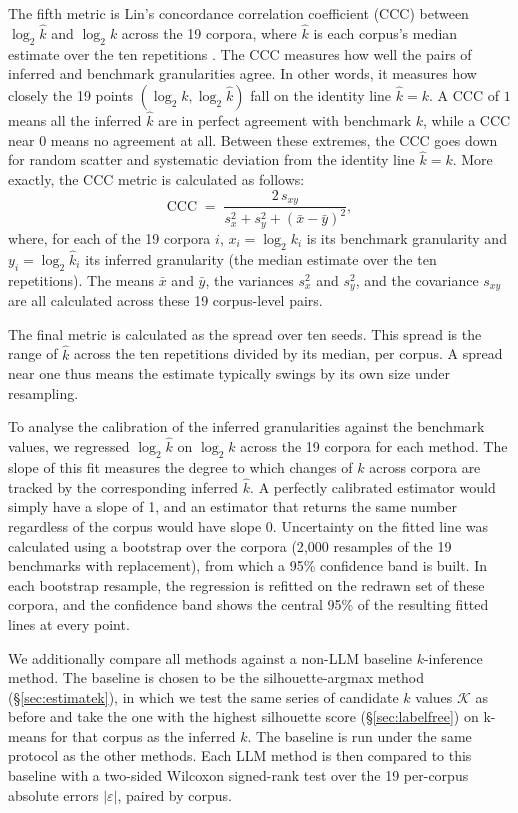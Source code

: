\documentclass[11pt,a4paper,oneside]{report}
\begin{document}
The fifth metric is Lin's concordance correlation coefficient (CCC) between $\log_2 \hat{k}$ and $\log_2 k$ across the 19 corpora, where $\hat{k}$ is each corpus's median estimate over the ten repetitions \citep{lin1989concordance}. The CCC measures how well the pairs of inferred and benchmark granularities agree. In other words, it measures how closely the 19 points $(\log_2 k, \log_2 \hat{k})$ fall on the identity line $\hat{k} = k$. A CCC of $1$ means all the inferred $\hat{k}$ are in perfect agreement with benchmark $k$, while a CCC near $0$ means no agreement at all. Between these extremes, the CCC goes down for random scatter and systematic deviation from the identity line $\hat{k} = k$. More exactly, the CCC metric is calculated as follows:
\[
\mathrm{CCC} \;=\; \frac{2\,s_{xy}}{s_x^2 + s_y^2 + \left(\bar{x} - \bar{y}\right)^2},
\]
where, for each of the 19 corpora $i$, $x_i = \log_2 k_i$ is its benchmark granularity and $y_i = \log_2 \hat{k}_i$ its inferred granularity (the median estimate over the ten repetitions). The means $\bar{x}$ and $\bar{y}$, the variances $s_x^2$ and $s_y^2$, and the covariance $s_{xy}$ are all calculated across these 19 corpus-level pairs.

The final metric is calculated as the spread over ten seeds. This spread is the range of $\hat{k}$ across the ten repetitions divided by its median, per corpus. A spread near one thus means the estimate typically swings by its own size under resampling.

To analyse the calibration of the inferred granularities against the benchmark values, we regressed $\log_2 \hat{k}$ on $\log_2 k$ across the 19 corpora for each method. The slope of this fit measures the degree to which changes of $k$ across corpora are tracked by the corresponding inferred $\hat{k}$. A perfectly calibrated estimator would simply have a slope of 1, and an estimator that returns the same number regardless of the corpus would have slope 0. Uncertainty on the fitted line was calculated using a bootstrap over the corpora (2{,}000 resamples of the 19 benchmarks with replacement), from which a 95\% confidence band is built. In each bootstrap resample, the regression is refitted on the redrawn set of these corpora, and the confidence band shows the central 95\% of the resulting fitted lines at every point.

We additionally compare all methods against a non-LLM baseline $k$-inference method. The baseline is chosen to be the silhouette-argmax method (\S\ref{sec:estimatek}), in which we test the same series of candidate $k$ values $\mathcal{K}$ as before and take the one with the highest silhouette score (\S\ref{sec:labelfree}) on k-means for that corpus as the inferred $k$. The baseline is run under the same protocol as the other methods. Each LLM method is then compared to this baseline with a two-sided Wilcoxon signed-rank test over the 19 per-corpus absolute errors $|\varepsilon|$, paired by corpus.
\end{document}
